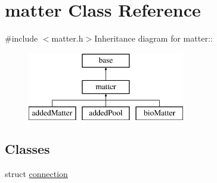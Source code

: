 \hypertarget{classmatter}{
\section{matter Class Reference}
\label{classmatter}
}


{\ttfamily \#include $<$matter.h$>$}Inheritance diagram for matter::\begin{figure}[H]
\begin{center}
\leavevmode
\includegraphics[height=3cm]{classmatter}
\end{center}
\end{figure}
\subsection*{Classes}
\begin{DoxyCompactItemize}
\item 
struct \hyperlink{structmatter_1_1connection}{connection}
\end{DoxyCompactItemize}
